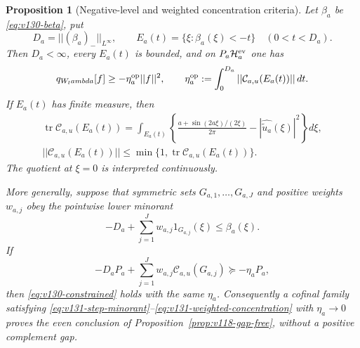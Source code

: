 \documentclass[11pt]{article}
\def\lambda{lambda}%
\def\norm#1{||#1||}%
\newtheorem{proposition}[theorem]{Proposition}
\theoremstyle{remark}
\newcommand{\norm}[1]{\left\lVert #1\right\rVert}
\begin{document}
\begin{proposition}[Negative-level and weighted concentration criteria]
\label{prop:v131-concentration}
Let $\beta_a$ be \eqref{eq:v130-beta}, put
\[
 D_a=\norm{(\beta_a)_-}_{L^\infty},\qquad
 E_a(t)=\{\xi:\beta_a(\xi)<-t\}\quad(0<t<D_a).
\]
Then $D_a<\infty$, every $E_a(t)$ is bounded, and on
$P_a\mathcal H_a^{\rm ev}$ one has
\begin{equation}\label{eq:v131-layercake}
 q_{W_\lambda}[f]\ge-\eta_a^{\rm op}\norm f^2,
 \qquad
 \eta_a^{\rm op}:=
 \int_0^{D_a}\norm{\mathcal C_{a,u}(E_a(t))}\,dt.
\end{equation}
If $E_a(t)$ has finite measure, then
\begin{align}
 \operatorname {tr}\mathcal C_{a,u}(E_a(t))
  =\int_{E_a(t)}\left\{
    \frac{a+\sin(2a\xi)/(2\xi)}{2\pi}
    -|\widehat{\widetilde u_a}(\xi)|^2\right\}d\xi,
 \label{eq:v131-trace}\\
 \norm{\mathcal C_{a,u}(E_a(t))}
  \le \min\{1,\operatorname {tr}\mathcal C_{a,u}(E_a(t))\}.
 \label{eq:v131-trace-bound}
\end{align}
The quotient at $\xi=0$ is interpreted continuously.

More generally, suppose that symmetric sets $G_{a,1},\ldots,G_{a,J}$
and positive weights $w_{a,j}$ obey the pointwise lower minorant
\begin{equation}\label{eq:v131-step-minorant}
 -D_a+\sum_{j=1}^Jw_{a,j}1_{G_{a,j}}(\xi)
 \le\beta_a(\xi).
\end{equation}
If
\begin{equation}\label{eq:v131-weighted-concentration}
 -D_aP_a+\sum_{j=1}^Jw_{a,j}\mathcal C_{a,u}(G_{a,j})
 \succeq-\eta_aP_a,
\end{equation}
then \eqref{eq:v130-constrained} holds with the same $\eta_a$.
Consequently a cofinal family satisfying
\eqref{eq:v131-step-minorant}--\eqref{eq:v131-weighted-concentration}
with $\eta_a\to0$ proves the even conclusion of
Proposition~\ref{prop:v118-gap-free}, without a positive complement
gap.
\end{proposition}
\end{document}
